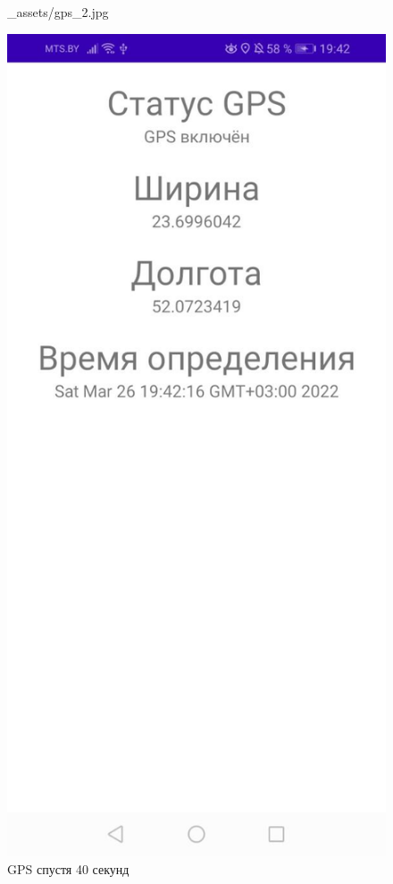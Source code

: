 \documentclass[12pt, a4paper, simple]{eskdtext}
\begin{document}
\begin{figure}[!h]
\begin{minipage}{0.19\textwidth}
                {_assets/gps_2.jpg}
            \caption{GPS спустя 40 секунд}
            \label{fig:i_draw_S}
        \end{minipage}
        \begin{minipage}{0.19\textwidth}
            \centering
            \includegraphics[width=\linewidth]
                {_assets/gps_3.jpg}
            \caption{GPS спустя 40 секунд}
            \label{fig:i_draw_S}
        \end{minipage}
    \end{figure}
\end{document}
